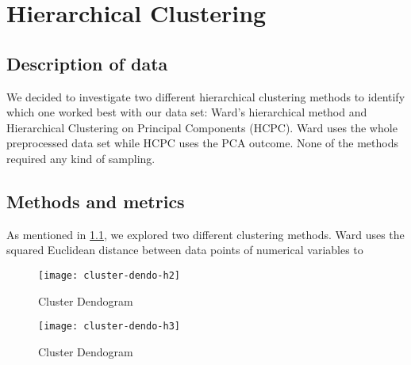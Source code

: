 

\section{Hierarchical Clustering}%
\label{sec:hierarchical_clustering}

\subsection{Description of data}%
\label{sub:description_data}


We decided to investigate two different hierarchical clustering methods to
identify which one worked best with our data set: Ward's hierarchical method and 
Hierarchical Clustering on Principal Components (HCPC). Ward uses
the whole preprocessed data set while HCPC uses the PCA outcome. None of the
methods required any kind of sampling.

\subsection{Methods and metrics}


As mentioned in \ref{sub:description_data}, we explored two different clustering methods.
Ward uses the squared Euclidean distance between data points of numerical variables
to 


\begin{figure}[H]
    \centering
    \texttt{[image: cluster-dendo-h2]}
    \caption{Cluster Dendogram}%
    \label{fig:dendogram-h2}
\end{figure}

\begin{figure}[H]
    \centering
    \texttt{[image: cluster-dendo-h3]}
    \caption{Cluster Dendogram}%
    \label{fig:dendogram-h3}
\end{figure}

